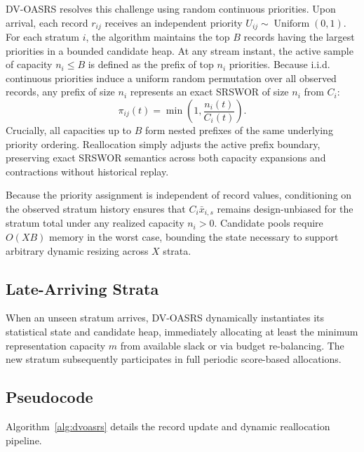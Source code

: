 \documentclass[conference]{IEEEtran}
\begin{document}
DV-OASRS resolves this challenge using random continuous priorities. Upon arrival, each record $r_{ij}$ receives an independent priority $U_{ij}\sim\operatorname{Uniform}(0,1)$. For each stratum $i$, the algorithm maintains the top $B$ records having the largest priorities in a bounded candidate heap. At any stream instant, the active sample of capacity $n_i \le B$ is defined as the prefix of top $n_i$ priorities. Because i.i.d. continuous priorities induce a uniform random permutation over all observed records, any prefix of size $n_i$ represents an exact SRSWOR of size $n_i$ from $C_i$:
\begin{equation}
 \pi_{ij}(t)=\min\left(1,\frac{n_i(t)}{C_i(t)}\right).
\end{equation}
Crucially, all capacities up to $B$ form nested prefixes of the same underlying priority ordering. Reallocation simply adjusts the active prefix boundary, preserving exact SRSWOR semantics across both capacity expansions and contractions without historical replay.

Because the priority assignment is independent of record values, conditioning on the observed stratum history ensures that $C_i\bar{x}_{i,s}$ remains design-unbiased for the stratum total under any realized capacity $n_i>0$. Candidate pools require $O(XB)$ memory in the worst case, bounding the state necessary to support arbitrary dynamic resizing across $X$ strata.

\subsection{Late-Arriving Strata}

When an unseen stratum arrives, DV-OASRS dynamically instantiates its statistical state and candidate heap, immediately allocating at least the minimum representation capacity $m$ from available slack or via budget re-balancing. The new stratum subsequently participates in full periodic score-based allocations.

\subsection{Pseudocode}

Algorithm~\ref{alg:dvoasrs} details the record update and dynamic reallocation pipeline.
\end{document}
